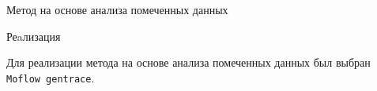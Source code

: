 \documentclass[10pt]{beamer}
\begin{document}
\begin{frame}[fragile]{Метод на основе анализа помеченных данных}


\end{frame}



\begin{frame}{Реaлизация}

Для реализации метода на основе анализа помеченных данных был выбран \texttt{Moflow gentrace}.

\end{frame}
\end{document}
